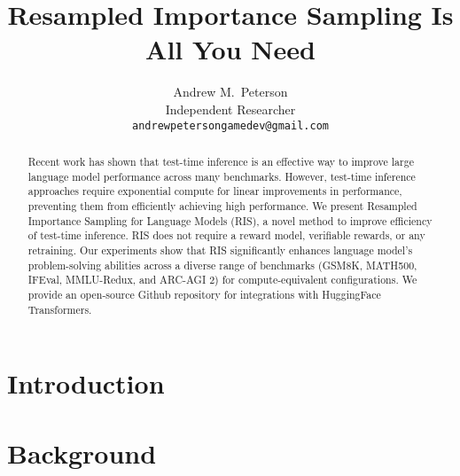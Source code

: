 \documentclass{article}
\title{Resampled Importance Sampling Is All You Need}
\author{
  Andrew M.~Peterson \\
 Independent Researcher \\
  \texttt{andrewpetersongamedev@gmail.com} \\
}
\begin{document}
\maketitle


\begin{abstract}
  Recent work has shown that test-time inference is an effective way to improve large language model performance across many benchmarks. However, test-time inference approaches require exponential compute for linear improvements in performance, preventing them from efficiently achieving high performance. We present Resampled Importance Sampling for Language Models (RIS), a novel method to improve efficiency of test-time inference. RIS does not require a reward model, verifiable rewards, or any retraining. Our experiments show that RIS significantly enhances language model's problem-solving abilities across a diverse range of benchmarks (GSM8K, MATH500, IFEval, MMLU-Redux, and ARC-AGI 2) for compute-equivalent configurations. We provide an open-source Github repository for integrations with HuggingFace Transformers.
\end{abstract}


\section{Introduction}

\section{Background}




\end{document}
